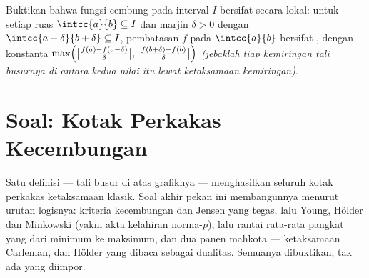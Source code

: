 \begin{exercise}[$\star\star\star$]\label{exo:b2:realfun:12}
Buktikan bahwa fungsi cembung pada interval \emph{} $I$ bersifat
 secara lokal: untuk setiap ruas $\intcc{a}{b} \subseteq I$
dan marjin $\delta > 0$ dengan $\intcc{a - \delta}{b + \delta}
\subseteq I$, pembatasan $f$ pada $\intcc{a}{b}$ bersifat
, dengan konstanta
$\max\Bigl(\bigl|\frac{f(a) - f(a - \delta)}{\delta}\bigr|,
\bigl|\frac{f(b + \delta) - f(b)}{\delta}\bigr|\Bigr)$
\emph{(jebaklah tiap kemiringan tali busurnya di antara kedua nilai itu
lewat ketaksamaan kemiringan)}.
\end{exercise}

\section{Soal: Kotak Perkakas Kecembungan}

Satu definisi --- tali busur di atas grafiknya --- menghasilkan
seluruh kotak perkakas ketaksamaan klasik. Soal akhir pekan ini
membangunnya menurut urutan logisnya: kriteria kecembungan dan Jensen
yang tegas, lalu Young, Hölder dan Minkowski (yakni akta kelahiran
norma-$p$), lalu rantai rata-rata pangkat yang  dari minimum ke
maksimum, dan dua panen mahkota --- ketaksamaan Carleman, dan
Hölder yang dibaca sebagai dualitas. Semuanya dibuktikan; tak ada yang
diimpor.

